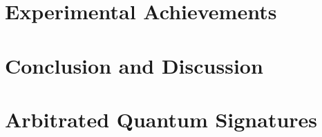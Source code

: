 \documentclass[%
 reprint,
 amsmath,amssymb,
 aps,
 pra,
]{revtex4-1}
\begin{document}
\section{Experimental Achievements}
\label{sec:experiments}

\section{Conclusion and Discussion}
\label{sec:conclusion}


\appendix

\section{Arbitrated Quantum Signatures}
\end{document}

